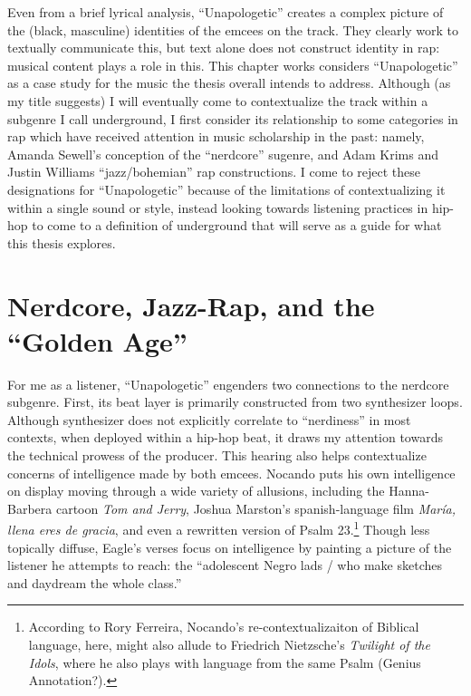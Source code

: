 Even from a brief lyrical analysis, ``Unapologetic'' creates a complex picture of the (black, masculine) identities
of the emcees on the track. They clearly work to textually communicate this, but text alone does not construct identity
in rap: musical content plays a role in this. This chapter works considers ``Unapologetic'' as a case study for the music
the thesis overall intends to address. Although (as my title suggests) I will eventually come to contextualize the track
within a subgenre I call underground, I first consider its relationship to some categories in rap which have received
attention in music scholarship in the past: namely, Amanda Sewell's conception of the ``nerdcore'' sugenre, and Adam Krims
and Justin Williams ``jazz/bohemian'' rap constructions. I come to reject these designations for ``Unapologetic'' because
of the limitations of contextualizing it within a single sound or style, instead looking towards listening practices in
hip-hop to come to a definition of underground that will serve as a guide for what this thesis explores.


\section{Nerdcore, Jazz-Rap, and the ``Golden Age''} \label{nerdcorejazzrapgoldenage}

For me as a listener, ``Unapologetic'' engenders two connections to the nerdcore subgenre. First, its beat 
layer is primarily constructed from two synthesizer loops. Although synthesizer does not explicitly
correlate to ``nerdiness'' in most contexts, when deployed within a hip-hop beat, it draws my attention
towards the technical prowess of the producer. This hearing also helps contextualize concerns of intelligence
made by both emcees. Nocando puts his own intelligence on display moving through a wide variety of allusions, 
including the Hanna-Barbera cartoon \textit{Tom and Jerry}, Joshua Marston's spanish-language film 
\textit{María, llena eres de gracia}, and even a rewritten version of Psalm 23.\footnote{
    According to Rory Ferreira, Nocando's re-contextualizaiton of Biblical language, here, might also 
    allude to Friedrich Nietzsche's \textit{Twilight of the Idols}, where he also plays with language
    from the same Psalm (Genius Annotation?).} 
Though less topically diffuse, Eagle's verses focus on intelligence by painting a picture of the listener he
attempts to reach: the ``adolescent Negro lads / who make sketches and daydream the whole class.''

